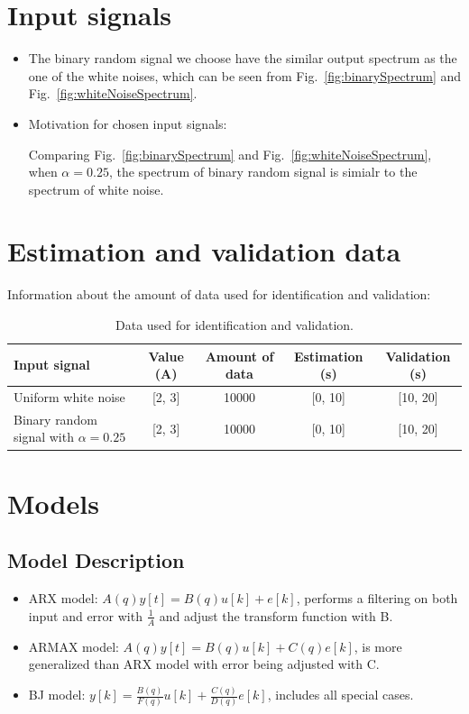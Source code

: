 \documentclass[10pt,a4paper]{article}
\begin{document}
\section{Input signals}
\begin{itemize}
    \item The binary random signal we choose have the similar output spectrum as the one of the white noises, which can be seen from Fig.~\ref{fig:binarySpectrum} and Fig.~\ref{fig:whiteNoiseSpectrum}.
    \item Motivation for chosen input signals:
    \par Comparing Fig.~\ref{fig:binarySpectrum} and Fig.~\ref{fig:whiteNoiseSpectrum}, when $\alpha=0.25$, the spectrum of binary random signal is simialr to the spectrum of white noise.
\end{itemize}

\section{Estimation and validation data}
\par Information about the amount of data used for identification and validation:
    \begin{table}[ht]
	    \footnotesize
    	\centering
    	\caption{Data used for identification and validation.}
    	\label{table:data}
    	\begin{tabular}{lcccc}
    	\hline
    	Input signal & Value (A) & Amount of data & Estimation (s) & Validation (s) \\
    	\hline
    	Uniform white noise & [2, 3] & 10000 & [0, 10] & [10, 20] \\
    	Binary random signal with $\alpha = 0.25$ & [2, 3] & 10000 & [0, 10] & [10, 20] \\
    	\hline
    	\end{tabular}
    \end{table}

\section{Models}
\subsection{Model Description}
\begin{itemize}
	\item ARX model: $A(q) y[t] = B(q) u[k] + e[k]$, performs a filtering on both input and error with $\frac{1}{A}$ and adjust the transform function with B.
    \item ARMAX model: $A(q) y[t] = B(q) u[k] + C(q) e[k]$, is more generalized than ARX model with error being adjusted with C.
    \item BJ model: $y[k] = \frac{B(q)}{F(q)} u[k] + \frac{C(q)}{D(q)} e[k]$, includes all special cases.
\end{itemize}
\end{document}
